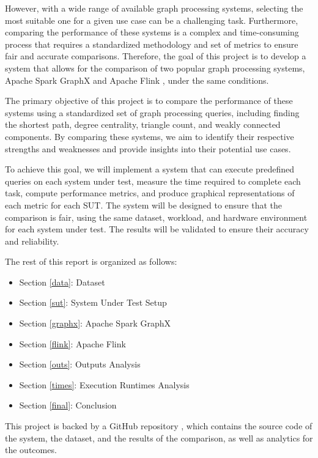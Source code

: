 \documentclass[conference]{IEEEtran}
\begin{document}
However, with a wide range of available graph processing systems, selecting the most suitable one for a given use case can be a challenging task. Furthermore, comparing the performance of these systems is a complex and time-consuming process that requires a standardized methodology and set of metrics to ensure fair and accurate comparisons. Therefore, the goal of this project is to develop a system that allows for the comparison of two popular graph processing systems, Apache Spark GraphX \cite{b1} and Apache Flink \cite{b2}, under the same conditions.

The primary objective of this project is to compare the performance of these systems using a standardized set of graph processing queries, including finding the shortest path, degree centrality, triangle count, and weakly connected components. By comparing these systems, we aim to identify their respective strengths and weaknesses and provide insights into their potential use cases.

To achieve this goal, we will implement a system that can execute predefined queries on each system under test, measure the time required to complete each task, compute performance metrics, and produce graphical representations of each metric for each SUT. The system will be designed to ensure that the comparison is fair, using the same dataset, workload, and hardware environment for each system under test. The results will be validated to ensure their accuracy and reliability.

The rest of this report is organized as follows:

\begin{itemize}
\item Section \ref{data}: Dataset
\item Section \ref{sut}: System Under Test Setup
\item Section \ref{graphx}: Apache Spark GraphX
\item Section \ref{flink}: Apache Flink
\item Section \ref{outs}: Outputs Analysis
\item Section \ref{times}: Execution Runtimes Analysis
\item Section \ref{final}: Conclusion
\end{itemize}

This project is backed by a GitHub repository \cite{b3} \cite{b4}, which contains the source code of the system, the dataset, and the results of the comparison, as well as analytics for the outcomes.
\end{document}
